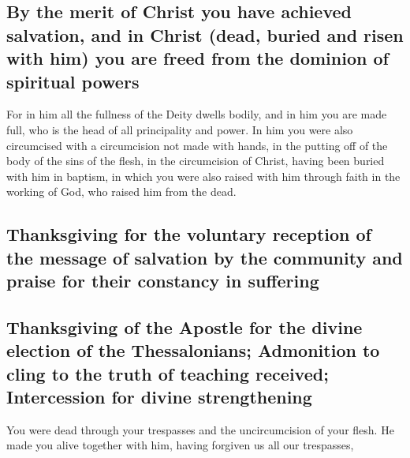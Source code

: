 \hypertarget{by-the-merit-of-christ-you-have-achieved-salvation-and-in-christ-dead-buried-and-risen-with-him-you-are-freed-from-the-dominion-of-spiritual-powers}{%
\subsection{By the merit of Christ you have achieved salvation, and in
Christ (dead, buried and risen with him) you are freed from the dominion
of spiritual
powers}\label{by-the-merit-of-christ-you-have-achieved-salvation-and-in-christ-dead-buried-and-risen-with-him-you-are-freed-from-the-dominion-of-spiritual-powers}}

 For in him all the fullness of the Deity dwells bodily,
 and in him you are made full, who is the head of all
principality and power.  In him you were also circumcised
with a circumcision not made with hands, in the putting off of the body
of the sins of the flesh, in the circumcision of Christ, 
having been buried with him in baptism, in which you were also raised
with him through faith in the working of God, who raised him from the
dead.

\hypertarget{thanksgiving-for-the-voluntary-reception-of-the-message-of-salvation-by-the-community-and-praise-for-their-constancy-in-suffering}{%
\subsection{Thanksgiving for the voluntary reception of the message of
salvation by the community and praise for their constancy in
suffering}\label{thanksgiving-for-the-voluntary-reception-of-the-message-of-salvation-by-the-community-and-praise-for-their-constancy-in-suffering}}

\hypertarget{thanksgiving-of-the-apostle-for-the-divine-election-of-the-thessalonians-admonition-to-cling-to-the-truth-of-teaching-received-intercession-for-divine-strengthening}{%
\subsection{Thanksgiving of the Apostle for the divine election of the
Thessalonians; Admonition to cling to the truth of teaching received;
Intercession for divine
strengthening}\label{thanksgiving-of-the-apostle-for-the-divine-election-of-the-thessalonians-admonition-to-cling-to-the-truth-of-teaching-received-intercession-for-divine-strengthening}}

 You were dead through your trespasses and the
uncircumcision of your flesh. He made you alive together with him,
having forgiven us all our trespasses,

